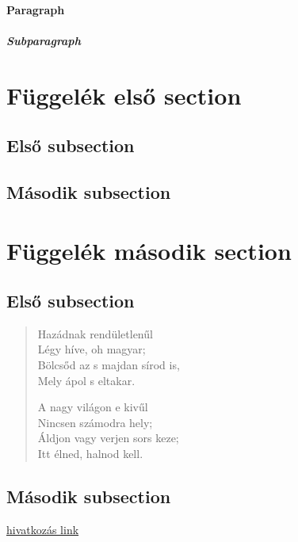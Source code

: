 \documentclass[12pt, twoside]{article}
\begin{document}
\paragraph{Paragraph}
\label{s:masodik}
\subparagraph{Subparagraph}

\appendix
\section{Függelék első section}
\subsection{Első subsection}
\quote{\hulipsum[2]}
\label{s:harmadik}
\subsection{Második subsection}
\quotation{\hulipsum[2]}

\section{Függelék második section}
\subsection{Első subsection}
\begin{verse}
Hazádnak rendületlenűl\\
Légy híve, oh magyar;\\
Bölcsőd az s majdan sírod is,\\
Mely ápol s eltakar.\newline

A nagy világon e kivűl\\
Nincsen számodra hely;\\
Áldjon vagy verjen sors keze;\\
Itt élned, halnod kell.
\end{verse}
\subsection{Második subsection}
\href{https://www.uni-miskolc.hu/~viktoria.vadon/}{hivatkozás link}
\end{document}

